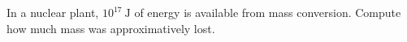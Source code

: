 In a nuclear plant, $10^{17}\ \mathrm{J}$ of energy is available from mass conversion. 
Compute how much mass was approximatively lost.